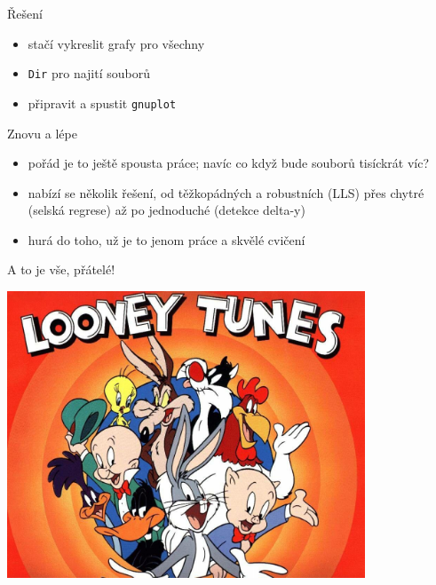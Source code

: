 \documentclass{beamer}
\begin{document}
\begin{frame}{Řešení}
  \begin{itemize}
    \item stačí vykreslit grafy pro všechny
    \item \texttt{Dir} pro najití souborů
    \item připravit a spustit \texttt{gnuplot}  
  \end{itemize}
\end{frame}

\begin{frame}{Znovu a lépe}
  \begin{itemize}
    \item pořád je to ještě spousta práce; navíc co když bude souborů tisíckrát víc?
    \item nabízí se několik řešení, od těžkopádných a robustních (LLS) přes chytré (selská regrese) až po jednoduché (detekce delta-y)
    \item hurá do toho, už je to jenom práce a skvělé cvičení
  \end{itemize}
\end{frame}

\begin{frame}{A to je vše, přátelé!}
  \begin{center}
    \includegraphics[width=0.8\textwidth]{looney_tunes}
  \end{center}
\end{frame}
\end{document}
